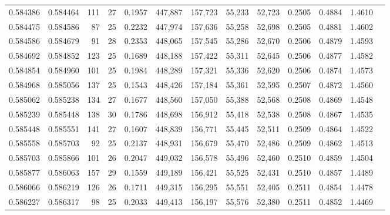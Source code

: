 \begin{tabular}{rrrrrrrrrrrrr}
0.584386 & 0.584464 &   111 &  27 &                                     0.1957 & 447,887 & 157,723 &  55,233 &  52,723 & 0.2505 & 0.4884 & 1.4610 \\
0.584475 & 0.584586 &    87 &  25 &                                     0.2232 & 447,974 & 157,636 &  55,258 &  52,698 & 0.2505 & 0.4881 & 1.4602 \\
0.584586 & 0.584679 &    91 &  28 &                                     0.2353 & 448,065 & 157,545 &  55,286 &  52,670 & 0.2506 & 0.4879 & 1.4593 \\
0.584692 & 0.584852 &   123 &  25 &                                     0.1689 & 448,188 & 157,422 &  55,311 &  52,645 & 0.2506 & 0.4877 & 1.4582 \\
0.584854 & 0.584960 &   101 &  25 &                                     0.1984 & 448,289 & 157,321 &  55,336 &  52,620 & 0.2506 & 0.4874 & 1.4573 \\
0.584968 & 0.585056 &   137 &  25 &                                     0.1543 & 448,426 & 157,184 &  55,361 &  52,595 & 0.2507 & 0.4872 & 1.4560 \\
0.585062 & 0.585238 &   134 &  27 &                                     0.1677 & 448,560 & 157,050 &  55,388 &  52,568 & 0.2508 & 0.4869 & 1.4548 \\
0.585239 & 0.585448 &   138 &  30 &                                     0.1786 & 448,698 & 156,912 &  55,418 &  52,538 & 0.2508 & 0.4867 & 1.4535 \\
0.585448 & 0.585551 &   141 &  27 &                                     0.1607 & 448,839 & 156,771 &  55,445 &  52,511 & 0.2509 & 0.4864 & 1.4522 \\
0.585558 & 0.585703 &    92 &  25 &                                     0.2137 & 448,931 & 156,679 &  55,470 &  52,486 & 0.2509 & 0.4862 & 1.4513 \\
0.585703 & 0.585866 &   101 &  26 &                                     0.2047 & 449,032 & 156,578 &  55,496 &  52,460 & 0.2510 & 0.4859 & 1.4504 \\
0.585877 & 0.586063 &   157 &  29 &                                     0.1559 & 449,189 & 156,421 &  55,525 &  52,431 & 0.2510 & 0.4857 & 1.4489 \\
0.586066 & 0.586219 &   126 &  26 &                                     0.1711 & 449,315 & 156,295 &  55,551 &  52,405 & 0.2511 & 0.4854 & 1.4478 \\
0.586227 & 0.586317 &    98 &  25 &                                     0.2033 & 449,413 & 156,197 &  55,576 &  52,380 & 0.2511 & 0.4852 & 1.4469 \\

\end{tabular}
